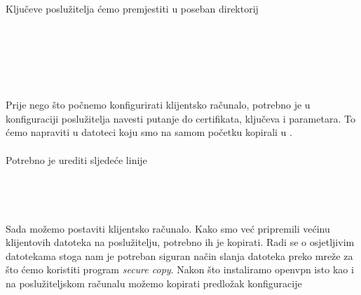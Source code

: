         \noindent
        Ključeve poslužitelja ćemo premjestiti u poseban direktorij \\

        \noindent
         \\
         \\
         \\
         \\
         \\
         \\

        \noindent
        Prije nego što počnemo konfigurirati klijentsko računalo, potrebno je u
        konfiguraciji poslužitelja navesti putanje do certifikata, ključeva i 
        parametara. To ćemo napraviti u datoteci  koju smo
        na samom početku kopirali u . \\
        
        \noindent
         \\
        
        \noindent
        Potrebno je urediti sljedeće linije \\

        \noindent
         \\
         \\
         \\
         \\ 

        Sada možemo postaviti klijentsko računalo. Kako smo već pripremili
        većinu klijentovih datoteka na poslužitelju, potrebno ih je kopirati.
        Radi se o osjetljivim datotekama stoga nam je potreban siguran način
        slanja datoteka preko mreže za što ćemo koristiti program
        \textit{secure copy}. Nakon što instaliramo openvpn isto kao i na
        poslužiteljskom računalu možemo kopirati predložak konfiguracije \\

        \noindent
         \\
         \\

